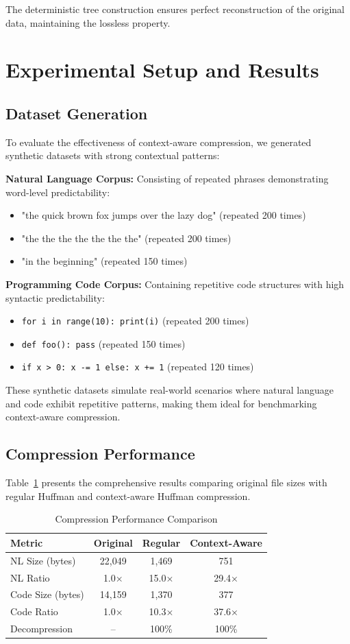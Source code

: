 \documentclass[conference]{IEEEtran}
\begin{document}
The deterministic tree construction ensures perfect reconstruction of the original data, maintaining the lossless property.

\section{Experimental Setup and Results}

\subsection{Dataset Generation}
To evaluate the effectiveness of context-aware compression, we generated synthetic datasets with strong contextual patterns:

\textbf{Natural Language Corpus:} Consisting of repeated phrases demonstrating word-level predictability:
\begin{itemize}
\item "the quick brown fox jumps over the lazy dog" (repeated 200 times)
\item "the the the the the the the" (repeated 200 times)
\item "in the beginning" (repeated 150 times)
\end{itemize}

\textbf{Programming Code Corpus:} Containing repetitive code structures with high syntactic predictability:
\begin{itemize}
\item \texttt{for i in range(10): print(i)} (repeated 200 times)
\item \texttt{def foo(): pass} (repeated 150 times)
\item \texttt{if x > 0: x -= 1 else: x += 1} (repeated 120 times)
\end{itemize}

These synthetic datasets simulate real-world scenarios where natural language and code exhibit repetitive patterns, making them ideal for benchmarking context-aware compression.

\subsection{Compression Performance}
Table~\ref{tab:results} presents the comprehensive results comparing original file sizes with regular Huffman and context-aware Huffman compression.

\begin{table}[htbp]
\caption{Compression Performance Comparison}
\label{tab:results}
\centering
\begin{tabular}{|l|c|c|c|}
\hline
\textbf{Metric} & \textbf{Original} & \textbf{Regular} & \textbf{Context-Aware} \\
\hline
NL Size (bytes) & 22,049 & 1,469 & 751 \\
NL Ratio & 1.0× & 15.0× & 29.4× \\
Code Size (bytes) & 14,159 & 1,370 & 377 \\
Code Ratio & 1.0× & 10.3× & 37.6× \\
Decompression & -- & 100\% & 100\% \\
\hline
\end{tabular}
\end{table}
\end{document}
